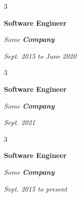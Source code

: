 \documentclass[10pt, letterpaper]{article}
\newenvironment{threecolentry}[3][]{
    \onecolentry
    \def\thirdColumn{#3}
    \setcolumnwidth{0.6 cm, \fill, 4.5 cm}
    \begin{paracol}{3}
    #2 \switchcolumn
}{
    \switchcolumn \raggedleft \thirdColumn
    \end{paracol}
    \endonecolentry
} %
\begin{document}
        \vspace{0.2 cm-3px}

        \begin{threecolentry}{
            \vspace*{\fill}
            \textbullet
            \vspace*{3px}
            \vspace*{\fill}
        }{
            
            
        \textit{Sept. 2015 to June 2020}}
            \textbf{Software Engineer}
            
            \textit{Some \textbf{Company}}
        \end{threecolentry}



        \vspace{0.2 cm-3px}

        \begin{threecolentry}{
            \vspace*{\fill}
            \textbullet
            \vspace*{3px}
            \vspace*{\fill}
        }{
            
            
        \textit{Sept. 2021}}
            \textbf{Software Engineer}
            
            \textit{Some \textbf{Company}}
        \end{threecolentry}



        \vspace{0.2 cm-3px}

        \begin{threecolentry}{
            \vspace*{\fill}
            \textbullet
            \vspace*{3px}
            \vspace*{\fill}
        }{
            
            
        \textit{Sept. 2015 to present}}
            \textbf{Software Engineer}
            
            \textit{Some \textbf{Company}}
        \end{threecolentry}
\end{document}
